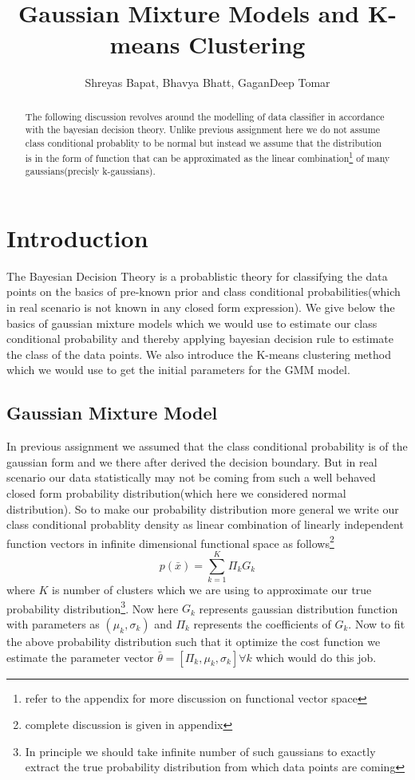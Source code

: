 \documentclass[a4paper]{article}
\title{Gaussian Mixture Models and K-means Clustering}
\author{Shreyas Bapat, Bhavya Bhatt, GaganDeep Tomar}
\begin{document}
\maketitle

\begin{abstract}
The following discussion revolves around the modelling of data classifier in accordance with the bayesian decision theory. Unlike previous assignment here we do not assume class conditional probablity to be normal but instead we assume that the distribution is in the form of function that can be approximated as the linear combination\footnote{refer to the appendix for more discussion on functional vector space} of many gaussians(precisly k-gaussians).
\end{abstract}

\section{Introduction}

The Bayesian Decision Theory is a probablistic theory for classifying the data points on the basics of pre-known prior and class conditional probabilities(which in real scenario is not known in any closed form expression). We give below the basics of gaussian mixture models which we would use to estimate our class conditional probability and thereby applying bayesian decision rule to estimate the class of the data points. We also introduce the K-means clustering method which we would use to get the initial parameters for the GMM model.
\subsection{Gaussian Mixture Model}
In previous assignment we assumed that the class conditional probability is of the gaussian form and we there after derived the decision boundary. But in real scenario our data statistically may not be coming from such a well behaved closed form probability distribution(which here we considered normal distribution). So to make our probability distribution more general we write our class conditional probablity density as linear combination of linearly independent function vectors in infinite dimensional functional space as follows\footnote{complete discussion is given in appendix}
\begin{equation}
p(\bar{x}) = \sum_{k=1}^{K}\Pi_{k}G_{k}
\end{equation}where $K$ is number of clusters which we are using to approximate our true probability distribution\footnote{In principle we should take infinite number of such gaussians to exactly extract the true probability distribution from which data points are coming}. Now here $G_{k}$ represents gaussian distribution function with parameters as $\left(\mu_{k}, \sigma_{k}\right)$ and $\Pi_{k}$ represents the coefficients of $G_{k}$. Now to fit the above probability distribution such that it optimize the cost function we estimate the parameter vector $\bar{\theta}=\left[\Pi_{k}, \mu_{k}, \sigma_{k}\right] \forall k$ which would do this job.
\end{document}
